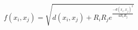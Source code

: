 \begin{equation}
f(x_i,x_j) = \sqrt{
                    d(x_i,x_j) +
                    R_i R_j e^{\frac{-d(x_i,x_j)^2}{4 R_i R_j}}
                  }
\label{equation:generalized_born}
\end{equation}
